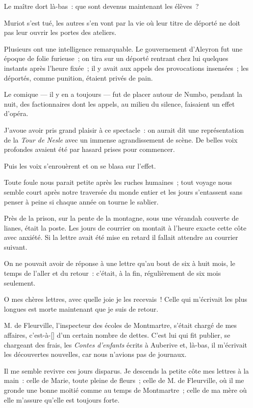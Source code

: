 \documentclass[french,twoside]{book} %
\newcommand\corr[1]{#1}
\begin{document}
Le maître dort là-bas : que sont devenus maintenant les élèves ?\par
Muriot s’est tué, les autres s’en vont par la vie où leur titre de déporté ne doit pas leur ouvrir les portes des ateliers.\par
Plusieurs ont une intelligence remarquable. Le gouvernement d’Aleyron fut une époque de folie furieuse ; on tira sur un déporté rentrant chez lui quelques instants après l’heure fixée ; il y avait aux appels des provocations insensées ; les déportés, comme punition, étaient privés de pain.\par
Le comique — il y en a toujours — fut de placer autour de Numbo, pendant la nuit, des factionnaires dont les appels, au milieu du silence, faisaient un effet d’opéra.\par
J’avoue avoir pris grand plaisir à ce spectacle : on aurait dit une représentation de la \emph{Tour de  Nesle} avec un immense agrandissement de scène. De belles voix profondes avaient été par hasard prises pour commencer.\par
Puis les voix s’enrouèrent et on se blasa sur l’effet.\par
Toute foule nous parait petite après les ruches humaines ; tout voyage nous semble court après notre traversée du monde entier et les jours s’entassent sans penser à peine si chaque année on tourne le sablier.\par
Près de la prison, sur la pente de la montagne, sous une vérandah couverte de lianes, était la poste. Les jours de courrier on montait à l’heure exacte cette côte avec anxiété. Si la lettre avait été mise en retard il fallait attendre au courrier suivant.\par
On ne pouvait avoir de réponse à une lettre qu’au bout de six à huit mois, le temps de l’aller et du retour : c’était, à la fin, régulièrement de six mois seulement.\par
O mes chères lettres, avec quelle joie je les recevais ! Celle qui m’écrivait les plus longues est morte maintenant que je suis de retour.\par
M. de Fleurville, l’inspecteur des écoles de Montmartre, s’était chargé de mes affaires, c’est-à-[{\corr }] d’un certain nombre de dettes. C’est lui qui fit publier, se chargeant des frais, les \emph{Contes d’enfants } écrits à Auberive et, là-bas, il m’écrivait les découvertes nouvelles, car nous n’avions pas de journaux.\par
Il me semble revivre ces jours disparus. Je descends la petite côte mes lettres à la main : celle de Marie, toute pleine de fleurs ; celle de M. de Fleurville, où il me gronde une bonne moitié comme au temps de Montmartre ; celle de ma mère où elle m’assure qu’elle est toujours forte.\par
\end{document}
